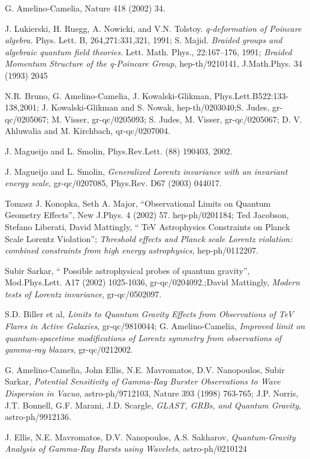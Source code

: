 \documentclass[12pt]{article}
\begin{document}
\begin{thebibliography}{0}
{{{G. Amelino-Camelia, Nature 418 (2002) 34.

J. Lukierski, H. Ruegg, A. Nowicki, and V.N. Tolstoy. 
{\it q-deformation of Poincare algebra.}
Phys. Lett. B, 264,271:331,321, 1991; 
S. Majid. {\it 
Braided groups and algebraic quantum field theories.}
 Lett. Math. Phys., 22:167--176, 1991; {\it
Braided Momentum Structure of the q-Poincare Group},  hep-th/9210141, 
J.Math.Phys. 34 (1993) 2045 

N.R. Bruno, G. Amelino-Camelia, J. Kowalski-Glikman,
Phys.Lett.B522:133-138,2001; J. Kowalski-Glikman and
S. Nowak, hep-th/0203040;S. Judes, gr-qc/0205067;
M. Visser, gr-qc/0205093; S. Judes, M. Visser, gr-qc/0205067;
D. V. Ahluwalia and M. Kirchbach, qr-qc/0207004.

J. Magueijo and  L. Smolin,
Phys.Rev.Lett. (88) 190403, 2002.

J. Magueijo and  L. Smolin, 
 {\it Generalized Lorentz invariance with an invariant energy scale}, gr-qc/0207085,
     Phys.Rev. D67 (2003) 044017. 

Tomasz J. Konopka, Seth A. Major,
``Observational Limits on Quantum Geometry Effects'', New J.Phys. 4 (2002) 57.
hep-ph/0201184;  Ted Jacobson, Stefano Liberati, David Mattingly,
`` TeV Astrophysics Constraints on Planck Scale Lorentz Violation'';
{\it Threshold effects and Planck scale Lorentz violation: combined constraints from high energy 
astrophysics}, hep-ph/0112207.

Subir Sarkar, `` Possible astrophysical probes of
quantum gravity'',  Mod.Phys.Lett. A17 (2002) 1025-1036,
gr-qc/0204092.;David Mattingly, {\it Modern tests of Lorentz invariance}, 
gr-qc/0502097.  

 S.D. Biller et al, {\it
Limits to Quantum Gravity Effects from Observations of TeV Flares in Active Galaxies},
 gr-qc/9810044;  G.  Amelino-Camelia, 
{\it Improved limit on quantum-spacetime modifications of Lorentz symmetry from observations 
of gamma-ray blazars}, gr-qc/0212002.

G. Amelino-Camelia, John Ellis, N.E. Mavromatos, D.V. Nanopoulos, 
Subir Sarkar,
{\it  Potential Sensitivity of Gamma-Ray Burster Observations to Wave Dispersion 
in Vacuo}, 
astro-ph/9712103, Nature 393 (1998) 763-765; 
J.P. Norris, J.T. Bonnell, G.F. Marani, J.D. Scargle, {\it
GLAST, GRBs, and Quantum Gravity}, 
astro-ph/9912136.

J. Ellis, N.E. Mavromatos, D.V.
Nanopoulos, A.S. Sakharov,   
{\it Quantum-Gravity Analysis of Gamma-Ray Bursts using Wavelets},
 astro-ph/0210124

}}}
\end{thebibliography}
\end{document}
